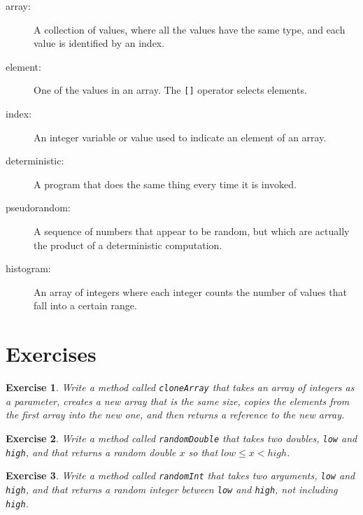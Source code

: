 \documentclass[12pt]{book}
\theoremstyle{exercise}
\newtheorem{exercise}{Exercise}[chapter]
\begin{document}
\begin{description}

\item[array:]  A collection of values, where all the
values have the same type, and each value is identified by
an index.

\item[element:]  One of the values in an array.  The {\tt []}
operator selects elements.

\item[index:]  An integer variable or value used to indicate
an element of an array.

\item[deterministic:]  A program that does the same thing every
time it is invoked.

\item[pseudorandom:]  A sequence of numbers that appear to be
random, but which are actually the product of a deterministic
computation.

\item[histogram:]  An array of integers where each integer
counts the number of values that fall into a certain range.


\end{description}


\section{Exercises}

\begin{exercise}
Write a method called {\tt cloneArray} that takes an
array of integers as a parameter, creates a new array that is the same
size, copies the elements from the first array into the new one, and
then returns a reference to the new array.
\end{exercise}


\begin{exercise}
Write a method called {\tt randomDouble} that takes two doubles,
{\tt low} and {\tt high}, and that returns a random double $x$
so that $low \le x < high$.
\end{exercise}


\begin{exercise}
\label{ex.randint}
Write a method called {\tt randomInt} that takes two arguments,
{\tt low} and {\tt high}, and that returns a random integer between
{\tt low} and {\tt high}, not including {\tt high}.
\end{exercise}
\end{document}
